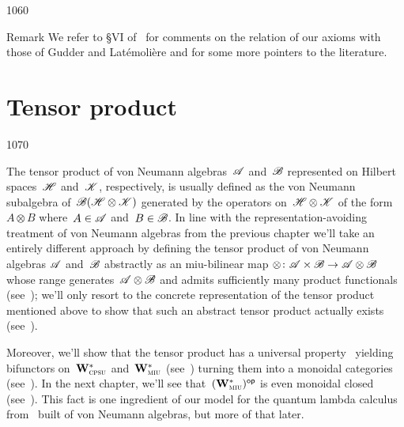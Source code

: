 \begin{parsec}{1060}
\begin{point}{50}{Remark}
We refer to \S{}VI of~\cite{westerbaan2016universal}
for comments on the relation
of our axioms
	with those of Gudder 
	and Lat\'emoli\`ere\cite{gudder2008characterization}
and for some more pointers to the literature.
\end{point}
\end{parsec}


\section{Tensor product}
\label{S:tensor}
\begin{parsec}{1070}%
\begin{point}{10}%
The tensor
product of von Neumann algebras~$\mathscr{A}$
and~$\mathscr{B}$
represented on Hilbert spaces~$\mathscr{H}$ and~$\mathscr{K}$,
respectively,
is usually defined as the von Neumann subalgebra
of~$\mathscr{B}(\mathscr{H}\otimes\mathscr{K})$
generated by the operators
on~$\mathscr{H}\otimes\mathscr{K}$
of the form~$A\otimes B$ where~$A\in\mathscr{A}$
and~$B\in\mathscr{B}$.
In line with the representation-avoiding
treatment of von Neumann algebras
from the previous chapter
we'll take an entirely different
approach
by defining the tensor product of von Neumann
algebras $\mathscr{A}$ and~$\mathscr{B}$ abstractly 
as an miu-bilinear map $\otimes\colon \mathscr{A}\times\mathscr{B}\to\mathscr{A}\otimes\mathscr{B}$
whose range generates~$\mathscr{A}\otimes\mathscr{B}$
and admits sufficiently many product functionals (see~);
we'll only resort to the concrete representation
of the tensor product  mentioned above to show that 
such an abstract tensor product actually exists (see~).

Moreover, we'll show that the tensor product has a universal
property~
yielding bifunctors on~$\mathbf{W}^*_{\text{\textsc{cpsu}}}$
and~$\mathbf{W}^*_{\text{\textsc{miu}}}$ (see~)
turning them into a monoidal categories
(see~).
In the next chapter,
    we'll see that~${(\mathbf{W}^*_{\text{\textsc{miu}}})}{^{\mathsf{op}}}$ is even
monoidal closed (see~).
This fact is one ingredient of our model for the quantum lambda calculus
from~\cite{model}
built of von Neumann algebras,
but more of that later.
\end{point}
\end{parsec}
